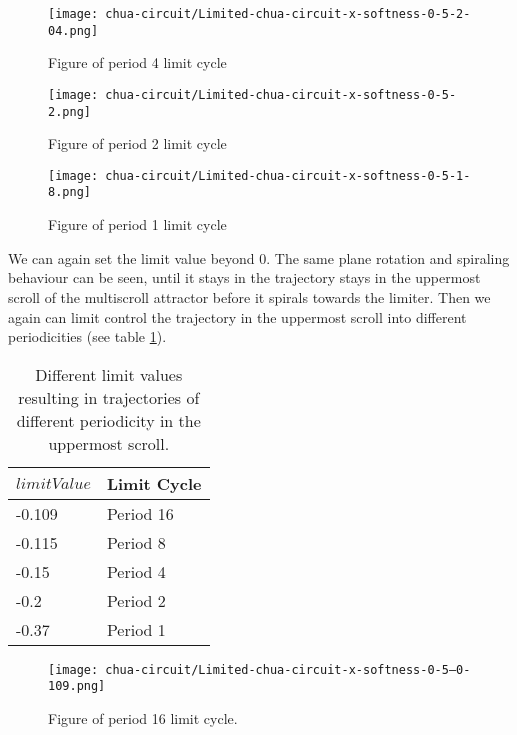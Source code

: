 \documentclass[main]{subfiles}
\begin{document}
\begin{figure}[H]
\centering
\texttt{[image: chua-circuit/Limited-chua-circuit-x-softness-0-5-2-04.png]}
\caption[Figure of period 4 limit cycle]{Figure of period 4 limit cycle}
\label{figure:x-0.5-4-limit-cycle-trajectory}
\end{figure}

\begin{figure}[H]
\centering
\texttt{[image: chua-circuit/Limited-chua-circuit-x-softness-0-5-2.png]}
\caption[Figure of period 3 limit cycle]{Figure of period 2 limit cycle}
\label{figure:x-0.5-2-limit-cycle-trajectory}
\end{figure}

\begin{figure}[H]
\centering
\texttt{[image: chua-circuit/Limited-chua-circuit-x-softness-0-5-1-8.png]}
\caption[Figure of period 1 limit cycle]{Figure of period 1 limit cycle}
\label{figure:x-0.5-1-limit-cycle-trajectory}
\end{figure}

We can again set the limit value beyond 0. The same plane rotation and spiraling behaviour can be seen, until it stays in the trajectory stays in the uppermost scroll of the multiscroll attractor before it spirals towards the limiter. Then we again can limit control the trajectory in the uppermost scroll into different periodicities (see table \ref{table:x-0.5-upperscroll-periodicities}).

\begin{table}[H]
\renewcommand{\arraystretch}{1.2}
\center
\begin{tabular}{@{}ll@{}}
	\toprule
   \(limitValue\) & Limit Cycle\\
   \midrule
   -0.109 & Period 16 \\
   -0.115 & Period 8 \\ 
   -0.15 & Period 4 \\
   -0.2  & Period 2 \\
   -0.37 & Period 1 \\
   \bottomrule
\end{tabular}
\caption[Limiter values for periodic trajectories for for an x self-limiting limiter with softness 0.13]{Different limit values resulting in trajectories of different periodicity in the uppermost scroll.}
\label{table:x-0.5-upperscroll-periodicities}
\end{table}

\begin{figure}[H]
\centering
\texttt{[image: chua-circuit/Limited-chua-circuit-x-softness-0-5--0-109.png]}
\caption[Figure of period 16 limit cycle]{Figure of period 16 limit cycle.}
\label{figure:x-0.5-16-limit-cycle-upperscroll-trajectory}
\end{figure}
\end{document}
